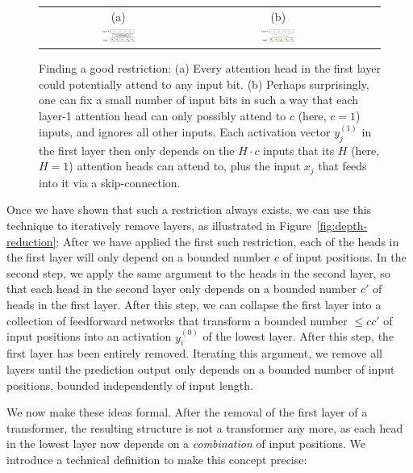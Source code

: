 \documentclass[11pt,a4paper]{article}
\begin{document}
\begin{figure}[ht]
    \centering
    \begin{tabular}{cccc}
    (a) & (b) \\
    \includegraphics[width=0.22\textwidth]{writeup/figures/restr-0b.png} &
        \includegraphics[width=0.22\textwidth]{writeup/figures/restr-2b.png}&
        \end{tabular}
	\caption{Finding a good restriction: (a) Every attention head in the first layer could potentially attend to any input bit. (b) Perhaps surprisingly, one can fix a small number of input bits in such a way that each layer-1 attention head can only possibly attend to $c$ (here, $c=1$) inputs, and ignores all other inputs. Each activation vector $y_j^{(1)}$ in the first layer then only depends on the $H\cdot c$ inputs that its $H$ (here, $H=1$) attention heads can attend to, plus the input $x_j$ that feeds into it via a skip-connection.}
	\label{fig:restr}
\end{figure}

Once we have shown that such a restriction always exists, we can use this technique to iteratively remove layers, as illustrated in Figure~\ref{fig:depth-reduction}:
After we have applied the first such restriction, each of the heads in the first layer will only depend on a bounded number $c$ of input positions.
In the second step, we apply the same argument to the heads in the second layer, so that each head in the second layer only depends on a bounded number $c'$ of heads in the first layer.
After this step, we can collapse the first layer into a collection of feedforward networks that transform a bounded number $\leq cc'$ of input positions into an activation $y_i^{(0)}$ of the lowest layer.
After this step, the first layer has been entirely removed.
Iterating this argument, we remove all layers until the prediction output only depends on a bounded number of input positions, bounded independently of input length.

We now make these ideas formal.
After the removal of the first layer of a transformer, the resulting structure is not a transformer any more, as each head in the lowest layer now depends on a \emph{combination} of input positions.
We introduce a technical definition to make this concept precise:
\end{document}
